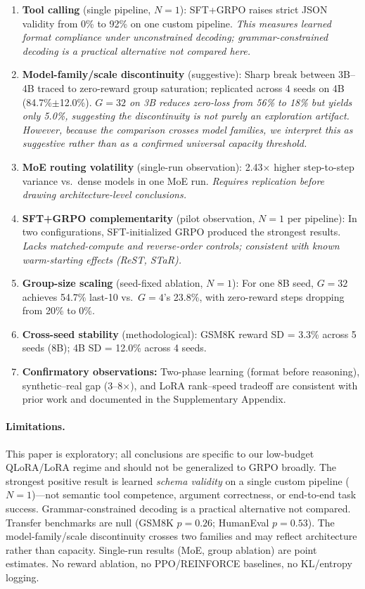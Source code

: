 \documentclass{article}
\begin{document}
\begin{enumerate}
    \item \textbf{Tool calling} (single pipeline, $N{=}1$): SFT+GRPO raises strict JSON validity from 0\% to 92\% on one custom pipeline. \emph{This measures learned format compliance under unconstrained decoding; grammar-constrained decoding is a practical alternative not compared here.}
    \item \textbf{Model-family/scale discontinuity} (suggestive): Sharp break between 3B--4B traced to zero-reward group saturation; replicated across 4 seeds on 4B (84.7\%$\pm$12.0\%). \emph{$G{=}32$ on 3B reduces zero-loss from 56\% to 18\% but yields only 5.0\%, suggesting the discontinuity is not purely an exploration artifact. However, because the comparison crosses model families, we interpret this as suggestive rather than as a confirmed universal capacity threshold.}
    \item \textbf{MoE routing volatility} (single-run observation): 2.43$\times$ higher step-to-step variance vs.\ dense models in one MoE run. \emph{Requires replication before drawing architecture-level conclusions.}
    \item \textbf{SFT+GRPO complementarity} (pilot observation, $N{=}1$ per pipeline): In two configurations, SFT-initialized GRPO produced the strongest results. \emph{Lacks matched-compute and reverse-order controls; consistent with known warm-starting effects (ReST, STaR).}
    \item \textbf{Group-size scaling} (seed-fixed ablation, $N{=}1$): For one 8B seed, $G{=}32$ achieves 54.7\% last-10 vs.\ $G{=}4$'s 23.8\%, with zero-reward steps dropping from 20\% to 0\%.
    \item \textbf{Cross-seed stability} (methodological): GSM8K reward SD = 3.3\% across 5 seeds (8B); 4B SD = 12.0\% across 4 seeds.
    \item \textbf{Confirmatory observations:} Two-phase learning (format before reasoning), synthetic--real gap (3--8$\times$), and LoRA rank--speed tradeoff are consistent with prior work and documented in the Supplementary Appendix.
\end{enumerate}

\paragraph{Limitations.} This paper is exploratory; all conclusions are specific to our low-budget QLoRA/LoRA regime and should not be generalized to GRPO broadly. The strongest positive result is learned \emph{schema validity} on a single custom pipeline ($N{=}1$)---not semantic tool competence, argument correctness, or end-to-end task success. Grammar-constrained decoding is a practical alternative not compared. Transfer benchmarks are null (GSM8K $p{=}0.26$; HumanEval $p{=}0.53$). The model-family/scale discontinuity crosses two families and may reflect architecture rather than capacity. Single-run results (MoE, group ablation) are point estimates. No reward ablation, no PPO/REINFORCE baselines, no KL/entropy logging.
\end{document}
